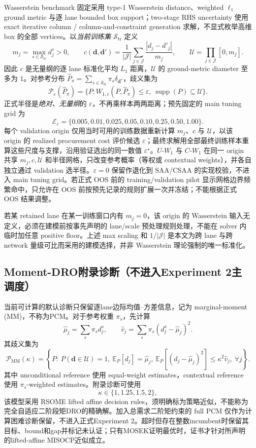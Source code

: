 \documentclass[11pt,a4paper]{ctexart}
\newcommand{\J}{\mathcal J}
\begin{document}
Wasserstein benchmark 固定采用 type-1 Wasserstein distance、weighted $\ell_1$ ground metric 与逐 lane bounded box support；two-stage RHS uncertainty 使用 exact iterative column / column-and-constraint generation 求解，不显式枚举高维 box 的全部 vertices。以\emph{当前训练集} $\mathcal S_{\mathrm{tr}}$ 定义
\[
m_j=\max_{s\in\mathcal S_{\mathrm{tr}}}d_j^s>0,
\qquad
c(\boldsymbol d,\boldsymbol d')
=\frac1{|\J|}\sum_{j\in\J}\frac{|d_j-d'_j|}{m_j},
\qquad
\mathcal U=\prod_{j\in\J}[0,m_j].
\]
因此 $c$ 是无量纲的逐 lane 标准化平均 $L_1$ 距离，$\mathcal U$ 的 ground-metric diameter 至多为 $1$。对参考分布 $\widehat P_\pi=\sum_{s\in\mathcal S_{\mathrm{tr}}}\pi_s\delta_{\boldsymbol d^s}$，歧义集为
\[
\mathcal P_{\varepsilon}(\widehat P_\pi)
=\{P:W_{1,c}(P,\widehat P_\pi)\le\varepsilon,
\ \operatorname{supp}(P)\subseteq\mathcal U\}.
\]
正式半径是\emph{绝对、无量纲}的 $\varepsilon$，不再乘样本两两距离；预先固定的 main tuning grid 为
\[
\mathcal E_{\varepsilon}=\{0.005,0.01,0.025,0.05,0.10,0.25,0.50,1.00\}.
\]
每个 validation origin 仅用当时可用的训练数据重新计算 $m_j$、$c$ 与 $\mathcal U$，以该 origin 的 realized procurement cost 评价候选 $\varepsilon$；最终求解用全部最终训练样本重算这些尺度与支撑，沿用验证选出的同一数值 $\varepsilon^\star$。$U$-$W_1$ 与 $C$-$W_1$ 在同一 origin 共享 $m_j,c,\mathcal U$ 和半径网格，只改变参考概率（等权或 contextual weights），并各自独立通过 validation 选半径。$\varepsilon=0$ 保留作退化到 SAA/CSAA 的实现校验，不进入 main tuning grid。若正式 OOS 前的 training/validation pilot 显示网格边界频繁命中，只允许在 OOS 前按预先记录的规则扩展一次并冻结；不能根据正式 OOS 结果调整。

若某 retained lane 在某一训练窗口内有 $m_j=0$，该 origin 的 Wasserstein 输入无定义，必须在建模前按事先声明的 lane/scale 预处理规则处理，不能在 solver 内临时加任意 positive floor。上述 max scaling 和 $1/|\J|$ 是本文为跨 lane 与跨 network 量级可比而采用的建模选择，并非 Wasserstein 理论强制的唯一标准化。

\subsection{Moment-DRO附录诊断（不进入Experiment 2主调度）}

当前可计算的默认诊断只保留逐lane边际均值--方差信息，记为 marginal-moment (MM)，不称为PCM。对于参考权重 $\pi_s$，先计算
\[
\widehat\mu_j=\sum_s\pi_s d_j^s,\qquad
\widehat v_j=\sum_s\pi_s(d_j^s-\widehat\mu_j)^2.
\]
其歧义集为
\[
\mathcal P_{\mathrm{MM}}(\kappa)
=\left\{
P:\ P(\boldsymbol d\in\mathcal U)=1,\ 
\mathbb E_P[d_j]=\widehat\mu_j,\ 
\mathbb E_P[(d_j-\widehat\mu_j)^2]\le \kappa^2\widehat v_j,\ \forall j
\right\}.
\]
其中 unconditional reference 使用 equal-weight estimates，contextual reference 使用 $\pi_s$-weighted estimates。附录诊断可使用
\[
\kappa\in\{1,1.25,1.5,2\},
\]
该模型采用 RSOME lifted affine decision rules，须明确标为策略近似，不能称为完全自适应二阶段矩DRO的精确解。加入总需求二阶矩约束的 full PCM 仅作为计算困难诊断保留，不进入正式Experiment 2。超时但存在整数incumbent时保留其目标、bound和gap并标记未认证；只有MOSEK证明最优时，证书才针对所声明的lifted-affine MISOCP近似成立。
\end{document}
